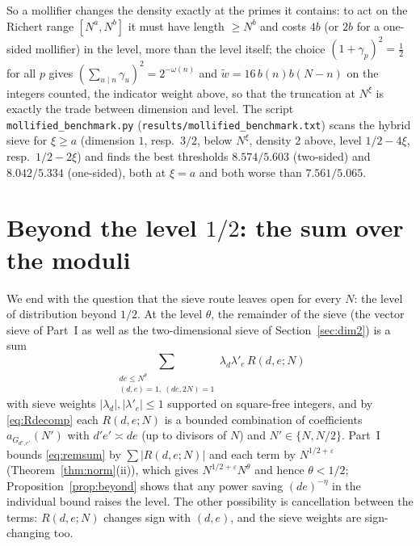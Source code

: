 ﻿\documentclass[11pt]{amsart}
\theoremstyle{remark}
\newcommand{\e}{\varepsilon}
\begin{document}
So a mollifier changes the density exactly at the primes it contains: to act on the Richert range $[N^a,N^b]$ it must have length $\ge N^b$ and costs $4b$ (or $2b$ for a one-sided mollifier) in the level, more than the level itself; the choice $(1+\gamma_p)^2=\frac12$ for all $p$ gives $(\sum_{u\mid n}\gamma_u)^2=2^{-\omega(n)}$ and $\tilde w=16\,b(n)b(N-n)$ on the integers counted, the indicator weight above, so that the truncation at $N^\xi$ is exactly the trade between dimension and level. The script \texttt{mollified\_benchmark.py} (\texttt{results/mollified\_benchmark.txt}) scans the hybrid sieve for $\xi\ge a$ (dimension $1$, resp.\ $3/2$, below $N^\xi$, density $2$ above, level $1/2-4\xi$, resp.\ $1/2-2\xi$) and finds the best thresholds $8.574/5.603$ (two-sided) and $8.042/5.334$ (one-sided), both at $\xi=a$ and both worse than $7.561/5.065$.

\section{Beyond the level $1/2$: the sum over the moduli}\label{sec:beyond}

We end with the question that the sieve route leaves open for every $N$: the level of distribution beyond $1/2$. At the level $\theta$, the remainder of the sieve (the vector sieve of Part~I as well as the two-dimensional sieve of Section~\ref{sec:dim2}) is a sum
\begin{equation}\label{eq:remsum}
\sum_{\substack{de\le N^\theta\\ (d,e)=1,\ (de,2N)=1}}\lambda_d\lambda'_e\,R(d,e;N)
\end{equation}
with sieve weights $|\lambda_d|,|\lambda'_e|\le1$ supported on square-free integers, and by \eqref{eq:Rdecomp} each $R(d,e;N)$ is a bounded combination of coefficients $a_{G_{d',e'}}(N')$ with $d'e'\asymp de$ (up to divisors of $N$) and $N'\in\{N,N/2\}$. Part~I bounds \eqref{eq:remsum} by $\sum|R(d,e;N)|$ and each term by $N^{1/2+\e}$ (Theorem~\ref{thm:norm}(ii)), which gives $N^{1/2+\e}N^{\theta}$ and hence $\theta<1/2$; Proposition~\ref{prop:beyond} shows that any power saving $(de)^{-\eta}$ in the individual bound raises the level. The other possibility is cancellation between the terms: $R(d,e;N)$ changes sign with $(d,e)$, and the sieve weights are sign-changing too.
\end{document}
